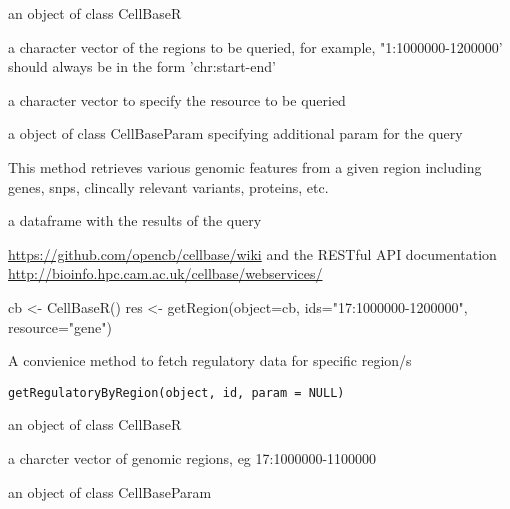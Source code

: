 \documentclass[letterpaper]{book}
\begin{document}
\begin{Arguments}
\begin{ldescription}
\item[\code{object}] an object of class CellBaseR

\item[\code{ids}] a character vector of the regions to be queried, for example,
"1:1000000-1200000' should always be in the
form 'chr:start-end'

\item[\code{resource}] a character vector to specify the resource to be queried

\item[\code{param}] a object of class CellBaseParam specifying additional param
for the query
\end{ldescription}
\end{Arguments}
%
\begin{Details}\relax
This method retrieves various genomic features from a given
region including genes, snps, clincally relevant variants, proteins, etc.
\end{Details}
%
\begin{Value}
a dataframe with the results of the query
\end{Value}
%
\begin{SeeAlso}\relax
\url{https://github.com/opencb/cellbase/wiki} 
and the RESTful API documentation 
\url{http://bioinfo.hpc.cam.ac.uk/cellbase/webservices/}
\end{SeeAlso}
%
\begin{Examples}
\begin{ExampleCode}
   cb <- CellBaseR()
   res <- getRegion(object=cb, ids="17:1000000-1200000", resource="gene")
\end{ExampleCode}
\end{Examples}
%
\begin{Description}\relax
A convienice method to fetch regulatory data for specific region/s
\end{Description}
%
\begin{Usage}
\begin{verbatim}
getRegulatoryByRegion(object, id, param = NULL)
\end{verbatim}
\end{Usage}
%
\begin{Arguments}
\begin{ldescription}
\item[\code{object}] an object of class CellBaseR

\item[\code{id}] a charcter vector of genomic regions, eg 17:1000000-1100000

\item[\code{param}] an object of class CellBaseParam
\end{ldescription}
\end{Arguments}
\end{document}
